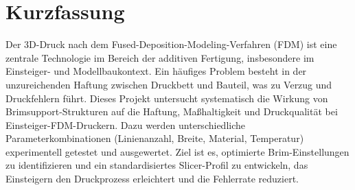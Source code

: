 \chapter*{Kurzfassung}
Der 3D-Druck nach dem Fused-Deposition-Modeling-Verfahren (FDM) ist eine zentrale Technologie im Bereich der additiven Fertigung, insbesondere im Einsteiger- und Modellbaukontext.
Ein häufiges Problem besteht in der unzureichenden Haftung zwischen Druckbett und Bauteil, was zu Verzug und Druckfehlern führt.
Dieses Projekt untersucht systematisch die Wirkung von Brimsupport-Strukturen auf die Haftung, Maßhaltigkeit und Druckqualität bei Einsteiger-FDM-Druckern.
Dazu werden unterschiedliche Parameterkombinationen (Linienanzahl, Breite, Material, Temperatur) experimentell getestet und ausgewertet.
Ziel ist es, optimierte Brim-Einstellungen zu identifizieren und ein standardisiertes Slicer-Profil zu entwickeln, das Einsteigern den Druckprozess erleichtert und die Fehlerrate reduziert.